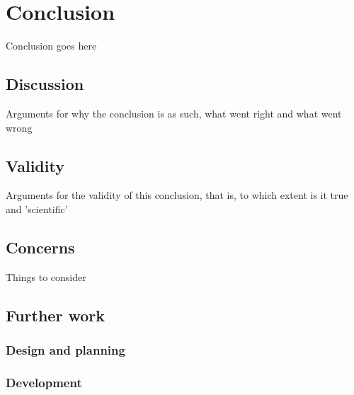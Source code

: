\chapter{Conclusion}
\label{ch:conclusion}

Conclusion goes here

\section{Discussion}

Arguments for why the conclusion is as such, what went right and what went wrong

\section{Validity}

Arguments for the validity of this conclusion, that is, to which extent is it true and 'scientific'

\section{Concerns}

Things to consider

\section{Further work}

\subsection{Design and planning}

\subsection{Development}
